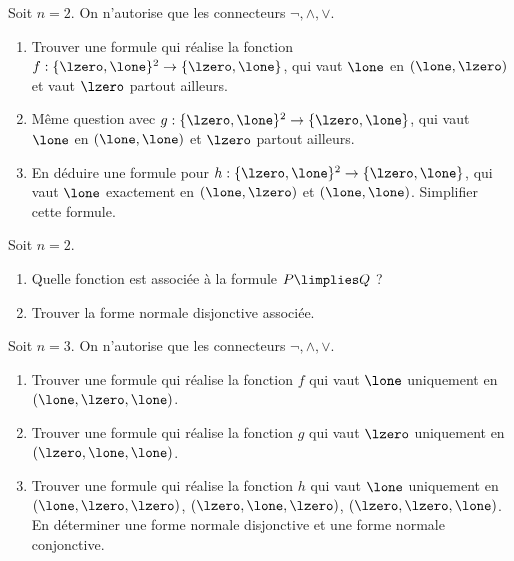 \documentclass[11pt,class=report,crop=false]{standalone}
\begin{document}
\begin{exercicecours}
	Soit $n=2$. On n'autorise que les connecteurs $\lnot,\land, \lor$.
	\begin{enumerate}
		\item Trouver une formule qui réalise la fonction $f : \{\lzero,\lone\}^2 \to \{\lzero,\lone\}$,
		qui vaut $\lone$ en $(\lone,\lzero)$ et vaut $\lzero$ partout ailleurs.  
		
		\item Même question avec $g : \{\lzero,\lone\}^2 \to \{\lzero,\lone\}$, qui vaut $\lone$ en $(\lone,\lone)$ et $\lzero$ partout ailleurs.
		
		\item En déduire une formule pour $h : \{\lzero,\lone\}^2 \to \{\lzero,\lone\}$, qui vaut $\lone$ exactement en $(\lone,\lzero)$ et $(\lone,\lone)$. Simplifier cette formule.
	\end{enumerate}
\end{exercicecours}


\begin{exercicecours}
	Soit $n=2$.
	\begin{enumerate}
		\item Quelle fonction est associée à la formule $P \limplies Q$ ?
		
		\item Trouver la forme normale disjonctive associée.
	\end{enumerate}
\end{exercicecours}


\begin{exercicecours}
	Soit $n=3$. On n'autorise que les connecteurs $\lnot,\land, \lor$.
	\begin{enumerate}
		\item Trouver une formule qui réalise la fonction $f$ qui vaut $\lone$ uniquement en $(\lone,\lzero,\lone)$.
		
		\item Trouver une formule qui réalise la fonction $g$ qui vaut $\lzero$ uniquement en $(\lzero,\lone,\lone)$.
		
		\item Trouver une formule qui réalise la fonction $h$ qui vaut $\lone$ uniquement en 
		$(\lone,\lzero,\lzero)$, $(\lzero,\lone,\lzero)$, $(\lzero,\lzero,\lone)$.
		En déterminer une forme normale disjonctive et une forme normale conjonctive.
	\end{enumerate}	
\end{exercicecours}
\end{document}
